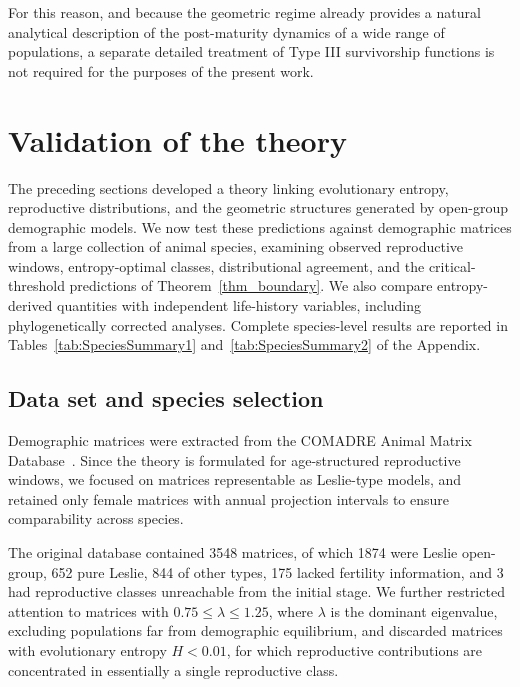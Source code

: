 \documentclass[10pt,a4paper]{amsart}
\theoremstyle{definition}
\theoremstyle{remark}
\numberwithin{equation}{section}
\begin{document}
For this reason, and because the geometric regime already provides a
natural analytical description of the post-maturity dynamics of a wide
range of populations, a separate detailed treatment of Type III
survivorship functions is not required for the purposes of the present
work.


\FloatBarrier

\section{Validation of the theory}\label{sec_Validation}

The preceding sections developed a theory linking evolutionary
entropy, reproductive distributions, and the geometric structures
generated by open-group demographic models. We now test these
predictions against demographic matrices from a large collection of
animal species, examining observed reproductive windows,
entropy-optimal classes, 
distributional agreement, and the critical-threshold predictions of
Theorem~\ref{thm_boundary}. We also compare entropy-derived
quantities with independent life-history variables, including
phylogenetically corrected analyses. Complete species-level results
are reported in Tables~\ref{tab:SpeciesSummary1}
and~\ref{tab:SpeciesSummary2} of the Appendix.

\subsection{Data set and species selection}

Demographic matrices were extracted from the COMADRE Animal Matrix
Database~\cite{COMADRE}. Since the theory is formulated for
age-structured reproductive windows, we focused on matrices
representable as Leslie-type models, and retained only female
matrices with annual projection intervals to ensure comparability
across species.

The original database contained 3548 matrices, of which 1874 were
Leslie open-group, 652 pure Leslie, 844 of other types, 175 lacked
fertility information, and 3 had reproductive classes unreachable
from the initial stage. We further restricted attention to matrices
with $0.75 \leq \lambda \leq 1.25$, where $\lambda$ is the dominant
eigenvalue, excluding populations far from demographic equilibrium,
and discarded matrices with evolutionary entropy $H<0.01$, for which
reproductive contributions are concentrated in essentially a single
reproductive class.
\end{document}
